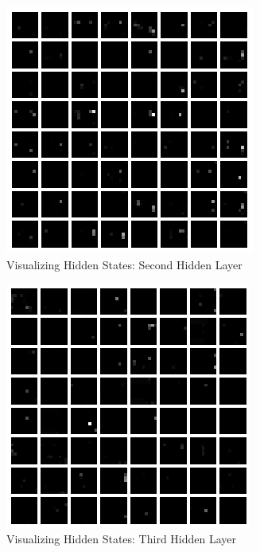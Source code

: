 \documentclass[10pt,twocolumn,letterpaper]{article}
\begin{document}
\begin{figure}[h]
\center
\includegraphics[width=\columnwidth]{layer2}
\caption{
Visualizing Hidden States: Second Hidden Layer
}\label{fig:layer2}
\end{figure}

\begin{figure}[h]
\center
\includegraphics[width=\columnwidth]{layer3}
\caption{
Visualizing Hidden States: Third Hidden Layer
}\label{fig:layer3}
\end{figure}
\end{document}
